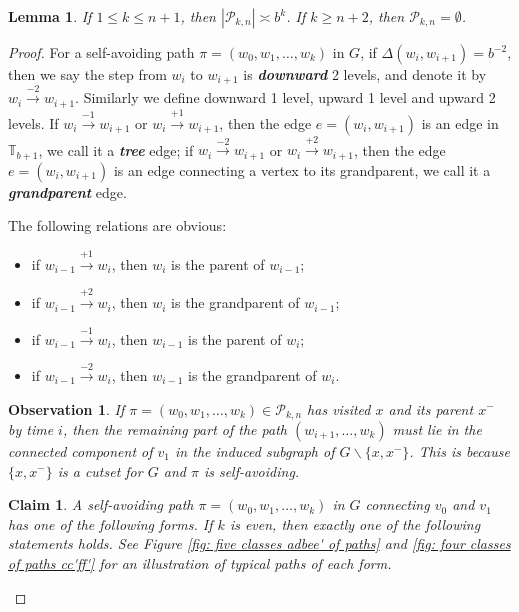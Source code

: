 \documentclass[12pt]{article}
\newtheorem{lemma}[theorem]{Lemma}
\newtheorem{observation}[theorem]{Observation}
\newtheorem{claim}[theorem]{Claim}
\numberwithin{equation}{section}
\newcommand{\1}{\mathbf{1}}
\newcommand{\notion}[1]{{\bf  \textit{#1}}}
\begin{document}
\begin{lemma}\label{lem: number of paths connecting two neighbors}
	If $1\leq k\leq n+1$, then  $	|\mathscr{P}_{k,n}|\asymp  b^k$.
	 If $k\geq n+2$, then $\mathscr{P}_{k,n}=\emptyset$.
\end{lemma}
 \begin{proof}
 	For a self-avoiding path $\pi=(w_0,w_1,\ldots,w_k)$ in $G$, if $\Delta(w_i,w_{i+1})=b^{-2}$, then we say the step from $w_i$ to $w_{i+1}$ is \notion{downward} 2 levels, and denote it by $w_i\stackrel{-2}{\rightarrow}w_{i+1}$. Similarly we define downward 1 level, upward 1 level and upward 2 levels. If $w_i\stackrel{-1}{\rightarrow}w_{i+1}$ or $w_i\stackrel{+1}{\rightarrow}w_{i+1}$, then the edge $e=(w_i,w_{i+1})$ is an edge in $\mathbb{T}_{b+1}$, we call it a \notion{tree} edge; if $w_i\stackrel{-2}{\rightarrow}w_{i+1}$ or $w_i\stackrel{+2}{\rightarrow}w_{i+1}$, then the edge $e=(w_i,w_{i+1})$ is an edge connecting a vertex to its grandparent, we call it a \notion{grandparent} edge.
 	
 	The following relations are obvious:
 	\begin{itemize}
 		\item  if $w_{i-1}\stackrel{+1}{\rightarrow}w_{i}$, then $w_i$ is the parent of $w_{i-1}$;
 		\item  if $w_{i-1}\stackrel{+2}{\rightarrow}w_{i}$, then $w_i$ is the grandparent of $w_{i-1}$;
 		\item  if $w_{i-1}\stackrel{-1}{\rightarrow}w_{i}$, then $w_{i-1}$ is the parent of $w_i$;
 		\item  if $w_{i-1}\stackrel{-2}{\rightarrow}w_{i}$, then $w_{i-1}$ is the grandparent of $w_{i}$.
 	\end{itemize}
 	
 	
 	\begin{observation}\label{obs: 5.5 self-avoiding path after x and its parent}
 		If $\pi=(w_0,w_1,\ldots,w_k)\in\mathscr{P}_{k,n}$ has visited $x$ and its parent $x^-$ by time $i$, then the remaining part of the path $(w_{i+1},\ldots,w_k)$ must lie in the connected component of $v_1$ in the induced subgraph of $G\backslash\{x,x^-\}$. This is because $\{x,x^-\}$ is a cutset for $G$ and $\pi$ is self-avoiding. 
 	\end{observation}
 	
 	\begin{claim}\label{claim: forms of paths}
 			A self-avoiding path $\pi=(w_0,w_1,\ldots,w_k)$ in $G$ connecting $v_0$ and $v_1$ has one of the following forms. 
 		If $k$ is even,  then exactly one of the following statements holds. See Figure \ref{fig: five classes adbee' of paths} and \ref{fig: four classes of paths cc'ff'} for an illustration of typical paths of each form.
 		

\end{claim}
\end{proof}
\end{document}
